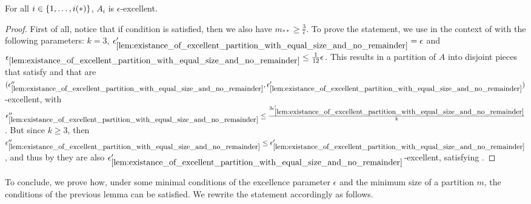 \begin{lemma}
\begin{enumerate}[label={\roman*}., ref={\roman*}, font=\rmfamily]
                    For all $i \in \{ 1, \dots, i(*) \}$, $A_i$ is $\epsilon$-excellent.
            \end{enumerate}
            \begin{proof}
                First of all, notice that if condition 
                is satisfied, then we also have $m_{**} \geq \frac{3}{\epsilon}$.
                To prove the statement, we use 
                in the context of  with the following parameters: $k = 3$,
                ${\epsilon'_{\ref{lem:existance_of_excellent_partition_with_equal_size_and_no_remainder}}} = \epsilon$
                and ${\epsilon_{\ref{lem:existance_of_excellent_partition_with_equal_size_and_no_remainder}}} \leq \frac{1}{12} \epsilon$.
                This results in a partition of $A$ into disjoint pieces that satisfy
                 and that are
                $( {\epsilon''_{\ref{lem:existance_of_excellent_partition_with_equal_size_and_no_remainder}}},
                    \epsilon'_{\ref{lem:existance_of_excellent_partition_with_equal_size_and_no_remainder}} )$-excellent,
                with ${\epsilon''_{\ref{lem:existance_of_excellent_partition_with_equal_size_and_no_remainder}}} \leq
                    \frac{3 \epsilon'_{\ref{lem:existance_of_excellent_partition_with_equal_size_and_no_remainder}}}{k}$.
                But since $k \geq 3$, then ${\epsilon''_{\ref{lem:existance_of_excellent_partition_with_equal_size_and_no_remainder}}} \leq
                    \epsilon'_{\ref{lem:existance_of_excellent_partition_with_equal_size_and_no_remainder}}$, and thus
                by  they are also
                $\epsilon'_{\ref{lem:existance_of_excellent_partition_with_equal_size_and_no_remainder}}$-excellent, satisfying
                .
            \end{proof}
        \end{lemma}

        To conclude, we prove how, under some minimal conditions
        of the excellence parameter $\epsilon$ and the minimum size of a partition $m$,
        the conditions of the previous lemma can be satisfied.
        We rewrite the statement accordingly as follows.

